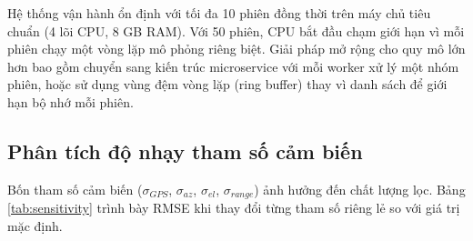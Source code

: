 \begin{table}[H]
\centering
\caption{Tài nguyên ước tính cho nhiều phiên đồng thời}
\label{tab:multi-session}
\end{table}

Hệ thống vận hành ổn định với tối đa 10 phiên đồng thời trên máy chủ tiêu chuẩn (4 lõi CPU, 8 GB RAM). Với 50 phiên, CPU bắt đầu chạm giới hạn vì mỗi phiên chạy một vòng lặp mô phỏng riêng biệt. Giải pháp mở rộng cho quy mô lớn hơn bao gồm chuyển sang kiến trúc microservice với mỗi worker xử lý một nhóm phiên, hoặc sử dụng vùng đệm vòng lặp (ring buffer) thay vì danh sách để giới hạn bộ nhớ mỗi phiên.

\subsection{Phân tích độ nhạy tham số cảm biến}

\hspace{0.5cm} Bốn tham số cảm biến ($\sigma_{GPS}$, $\sigma_{az}$, $\sigma_{el}$, $\sigma_{range}$) ảnh hưởng đến chất lượng lọc. Bảng \ref{tab:sensitivity} trình bày RMSE khi thay đổi từng tham số riêng lẻ so với giá trị mặc định.

\begin{table}[H]
\centering
\caption{Độ nhạy RMSE theo tham số cảm biến (xe máy, seed=42)}
\label{tab:sensitivity}
\end{table}

